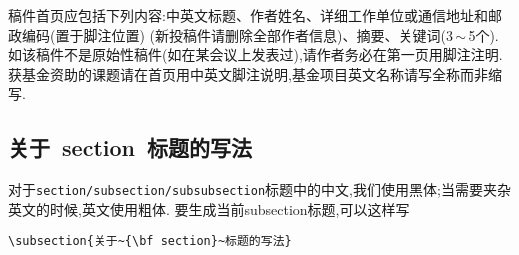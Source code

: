 \documentclass{Style/aas}
\begin{document}
稿件首页应包括下列内容:中英文标题、作者姓名、详细工作单位或通信地址和邮政编码(置于脚注位置)
(新投稿件请删除全部作者信息)、摘要、关键词(3\,$\sim$\,5个).
如该稿件不是原始性稿件(如在某会议上发表过),请作者务必在第一页用脚注注明.
获基金资助的课题请在首页用中英文脚注说明,基金项目英文名称请写全称而非缩写.

\subsection{关于~{\bf section}~标题的写法}
对于\verb|section/subsection/subsubsection|标题中的中文,我们使用黑体;当需要夹杂英文的时候,英文使用粗体.
要生成当前subsection标题,可以这样写
\begin{verbatim}
\subsection{关于~{\bf section}~标题的写法}
\end{verbatim}
\end{document}
